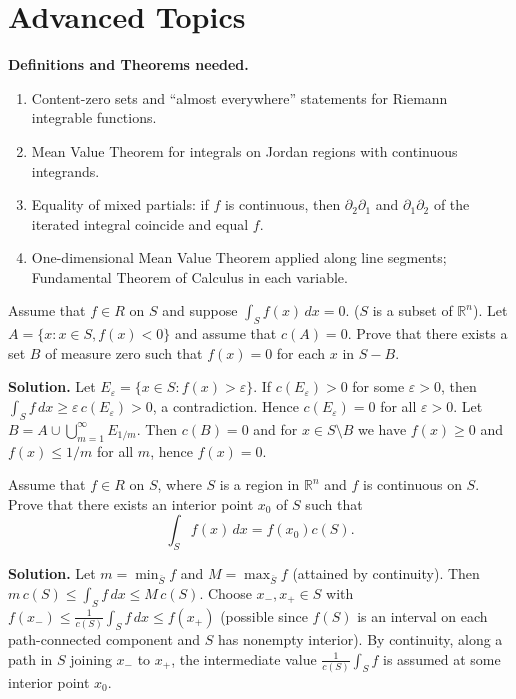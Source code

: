 \section{Advanced Topics}
\noindent\textbf{Definitions and Theorems needed.}
\begin{enumerate}[label=(\roman*)]
    \item Content-zero sets and ``almost everywhere'' statements for Riemann integrable functions.
    \item Mean Value Theorem for integrals on Jordan regions with continuous integrands.
    \item Equality of mixed partials: if $f$ is continuous, then $\partial_2\partial_1$ and $\partial_1\partial_2$ of the iterated integral coincide and equal $f$.
    \item One-dimensional Mean Value Theorem applied along line segments; Fundamental Theorem of Calculus in each variable.
\end{enumerate}

\begin{problembox}
Assume that \( f \in R \) on \( S \) and suppose \( \int_S f(x) \, dx = 0 \). (\( S \) is a subset of \( \mathbb{R}^n \)). Let \( A = \{ x : x \in S, f(x) < 0 \} \) and assume that \( c(A) = 0 \). Prove that there exists a set \( B \) of measure zero such that \( f(x) = 0 \) for each \( x \) in \( S - B \).
\end{problembox}

\noindent\textbf{Solution.}
Let $E_\varepsilon=\{x\in S:f(x)>\varepsilon\}$. If $c(E_\varepsilon)>0$ for some $\varepsilon>0$, then $\int_S f\,dx\ge \varepsilon\,c(E_\varepsilon)>0$, a contradiction. Hence $c(E_\varepsilon)=0$ for all $\varepsilon>0$. Let $B=A\cup\bigcup_{m=1}^\infty E_{1/m}$. Then $c(B)=0$ and for $x\in S\setminus B$ we have $f(x)\ge 0$ and $f(x)\le 1/m$ for all $m$, hence $f(x)=0$.

\begin{problembox}
Assume that \( f \in R \) on \( S \), where \( S \) is a region in \( \mathbb{R}^n \) and \( f \) is continuous on \( S \). Prove that there exists an interior point \( x_0 \) of \( S \) such that
\[\int_S f(x) \, dx = f(x_0)c(S).\]
\end{problembox}

\noindent\textbf{Solution.}
Let $m=\min_{\overline S} f$ and $M=\max_{\overline S} f$ (attained by continuity). Then $m\,c(S)\le \int_S f\,dx\le M\,c(S)$. Choose $x_-,x_+\in S$ with $f(x_-)\le \frac{1}{c(S)}\int_S f\,dx\le f(x_+)$ (possible since $f(S)$ is an interval on each path-connected component and $S$ has nonempty interior). By continuity, along a path in $S$ joining $x_-$ to $x_+$, the intermediate value $\frac{1}{c(S)}\int_S f$ is assumed at some interior point $x_0$.

